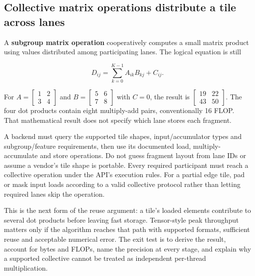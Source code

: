 \subsection{Collective matrix operations distribute a tile across lanes}\label{03-visual-computing-i-ch016-collective-matrix-operations-distribute-a-tile-across-lanes}

\hypertarget{03-visual-computing-i-ch016-collective-matrix-operations-distribute-a-tile-across-lanes}{}

A \textbf{subgroup matrix operation} cooperatively computes a small matrix product using values distributed among participating lanes. The logical equation is still

\[
D_{ij}=\sum_{k=0}^{K-1} A_{ik}B_{kj}+C_{ij}.
\]

For \(A=\begin{bmatrix}1&2\\3&4\end{bmatrix}\) and \(B=\begin{bmatrix}5&6\\7&8\end{bmatrix}\) with \(C=0\), the result is \(\begin{bmatrix}19&22\\43&50\end{bmatrix}\). The four dot products contain eight multiply-add pairs, conventionally 16 FLOP. That mathematical result does not specify which lane stores each fragment.

A backend must query the supported tile shapes, input/accumulator types and subgroup/feature requirements, then use its documented load, multiply-accumulate and store operations. Do not guess fragment layout from lane IDs or assume a vendor's tile shape is portable. Every required participant must reach a collective operation under the API's execution rules. For a partial edge tile, pad or mask input loads according to a valid collective protocol rather than letting required lanes skip the operation.

This is the next form of the reuse argument: a tile's loaded elements contribute to several dot products before leaving fast storage. Tensor-style peak throughput matters only if the algorithm reaches that path with supported formats, sufficient reuse and acceptable numerical error. The exit test is to derive the result, account for bytes and FLOPs, name the precision at every stage, and explain why a supported collective cannot be treated as independent per-thread multiplication.

